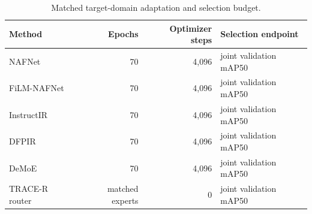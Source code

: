 \begin{table}[!t]
\centering
\caption{Matched target-domain adaptation and selection budget.}
\label{tab:training_audit}
\footnotesize
\setlength{\tabcolsep}{3.7pt}
\begin{tabular}{lrrl}
\toprule
Method & Epochs & Optimizer steps & Selection endpoint \\
\midrule
NAFNet & 70 & 4,096 & joint validation mAP50 \\
FiLM-NAFNet & 70 & 4,096 & joint validation mAP50 \\
InstructIR & 70 & 4,096 & joint validation mAP50 \\
DFPIR & 70 & 4,096 & joint validation mAP50 \\
DeMoE & 70 & 4,096 & joint validation mAP50 \\
TRACE-R router & matched experts & 0 & joint validation mAP50 \\
\bottomrule
\end{tabular}
\end{table}
